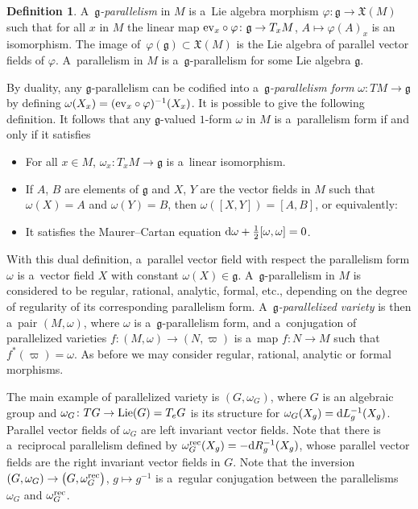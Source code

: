 \documentclass[10pt,a4paper]{amsart}
\numberwithin{equation}{section}
\theoremstyle{definition}
\newtheorem{Definition}[Theorem]{Definition}
\begin{document}
\begin{Definition} A~\emph{$\mathfrak g$-parallelism} in $M$ is a~Lie algebra morphism $\varphi\colon \mathfrak g \to \mathfrak X(M)$ such that for all $x$ in $M$ the linear map ${\rm ev}_x\circ \varphi\colon \mathfrak g \to T_xM$, $A\mapsto \varphi(A)_x$ is an isomorphism.
The image of~${\varphi(\mathfrak g) \subset \mathfrak X(M)}$ is the Lie algebra of parallel vector fields of $\varphi$. A~parallelism in $M$ is a~$\mathfrak g$-parallelism for some Lie algebra $\mathfrak g$.
\end{Definition}

By duality, any $\mathfrak g$-parallelism can be codified into a~\emph{$\mathfrak g$-parallelism form} $\omega\colon TM\to \mathfrak g$ by defining $\omega(X_x) = ({\rm ev}_x\circ \varphi)^{-1}(X_x)$. It is possible to give the following definition. It follows that any $\mathfrak g$-valued $1$-form $\omega$ in $M$ is a~parallelism form if and only if it satisfies
\begin{itemize}\itemsep=0pt
 \item[(1)] For all $x\in M$, $\omega_x\colon T_xM \to \mathfrak g$ is a~linear isomorphism.
 \item[(2)] If $A$, $B$ are elements of $\mathfrak g$ and $X$, $Y$ are the vector fields in $M$ such that $\omega(X) =A$ and $\omega(Y) = B$, then $\omega([X,Y]) = [A,B]$, or equivalently:
 \item[(2')] It satisfies the Maurer--Cartan equation ${\rm d}\omega + \frac{1}{2}[\omega,\omega] = 0$.
\end{itemize}

With this dual definition, a~parallel vector field with respect the parallelism form $\omega$ is a~vector field $X$ with constant $\omega(X)\in \mathfrak g$. A~$\mathfrak g$-parallelism in $M$ is considered to be regular, rational, analytic, formal, etc., depending on the degree of regularity of its corresponding parallelism form. A~\emph{$\mathfrak g$-parallelized variety} is then a~pair $(M,\omega)$, where $\omega$ is a~$\mathfrak g$-parallelism form, and a~conjugation of parallelized varieties $f\colon (M,\omega)\to (N,\varpi)$ is a~map $f\colon N\to M$ such that $f^*(\varpi) = \omega$. As before we may consider regular, rational, analytic or formal morphisms.

The main example of parallelized variety is $(G, \omega_G)$, where $G$ is an algebraic group and $\omega_G\colon TG\to {\rm Lie}(G) = T_eG$ is its structure for $\omega_G(X_g) = {\rm d}L_g^{-1}(X_g)$. Parallel vector fields of $\omega_G$ are left invariant vector fields. Note that there is a~reciprocal parallelism defined by ${\omega_G^{\rm rec}(X_g) = - {\rm d}R_{g}^{-1}(X_g)}$, whose parallel vector fields are the right invariant vector fields in $G$. Note that the inversion $(G,\omega_G) \to \bigl(G,\omega_G^{\rm rec}\bigr)$, $g\mapsto g^{-1}$ is a~regular conjugation between the parallelisms $\omega_G$ and $\omega_G^{\rm rec}$.
\end{document}
